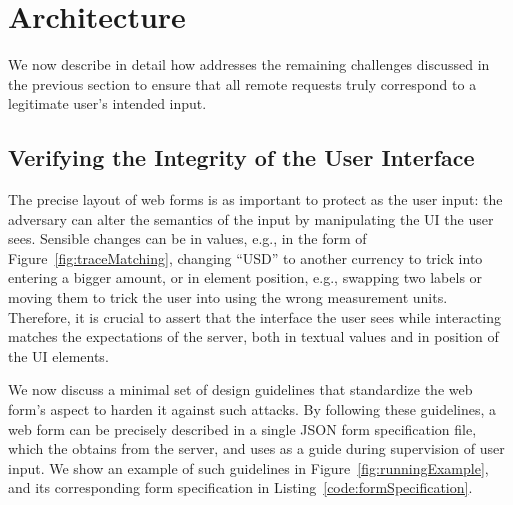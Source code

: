 \section{\sysname Architecture} \label{sec:hardenUI}

We now describe in detail how \sysname addresses the remaining challenges discussed in the previous section to ensure that all remote requests truly correspond to a legitimate user's intended input.


\subsection{Verifying the Integrity of the User Interface}
\label{sec:systemDesign:webpage}

The precise layout of web forms is as important to protect as the user input: the adversary can alter the semantics of the input by manipulating the UI the user sees.
Sensible changes can be in values, e.g., in the form of Figure~\ref{fig:traceMatching}, changing ``USD'' to another currency to trick into entering a bigger amount, or in element position, e.g., swapping two labels or moving them to trick the user into using the wrong measurement units.
Therefore, it is crucial to assert that the interface the user sees while interacting matches the expectations of the server, both in textual values and in position of the UI elements.

We now discuss a minimal set of design guidelines that standardize the web form's aspect to harden it against such attacks.
By following these guidelines, a web form can be precisely described in a single JSON form specification file, which the \app obtains from the server, and uses as a guide during supervision of user input.
We show an example of such guidelines in Figure~\ref{fig:runningExample}, and its corresponding form specification in Listing~\ref{code:formSpecification}.




